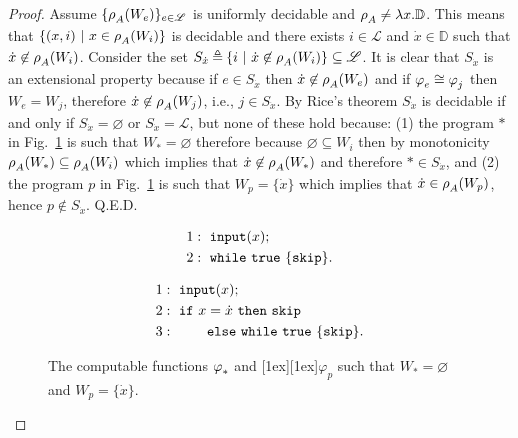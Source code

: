 \documentclass[runningheads]{llncs}
\def\ok#1{\mbox{\raisebox{0ex}[1ex][1ex]{$#1$}}}
\newcommand{\myqed}{\textsc{Q.E.D.}}
\newcommand{\ccL}{\mathscr{L}}
\newcommand{\Domain}{\mathbb{D}}
\newcommand{\pfunction}[3]{\ok{\varphi^{#2\, #3}_{#1}}}
\newcommand{\auco}[2]{\ok{\rho^{#1}_{#2}}}
\newcommand{\ud}{\ok{\:\triangleq\:}}
\def\ok#1{\mbox{\raisebox{0ex}[1ex][1ex]{$#1$}}}
\def\cAA{\ensuremath{A}}
\newcommand{\sset}[2]{\{#1  ~|~ #2\}}
\begin{document}
\begin{proof}
    Assume $\{\auco{}{\cAA}(W_e)\}_{e\in\ccL}$ is uniformly decidable and $\auco{}{\cAA}\neq\lambda x.\Domain$. This means that $\sset{(x,i)}{x\in\auco{}{\cAA}(W_i)}$ is decidable and there exists $i\in\ccL$ and $\dot{x}\in\Domain$ such that $\dot{x}\not\in \auco{}{\cAA}(W_i)$. Consider the set $S_{\dot{x}}\ud\sset{i}{\dot{x}\not\in \auco{}{\cAA}(W_i)}\subseteq\ccL$. It is clear that $S_{\dot{x}}$ is an extensional property because if $e\in S_{\dot{x}}$ then $\dot{x}\not\in \auco{}{\cAA}(W_e)$ and if $\pfunction{e}{}{}\cong\pfunction{j}{}{}$ then $W_e=W_j$, therefore $\dot{x}\not\in \auco{}{\cAA}(W_j)$, i.e., $j\in S_{\dot{x}}$. By Rice's theorem $S_{\dot{x}}$ is decidable if and only if $S_{\dot{x}}=\varnothing$ or $S_{\dot{x}}=\ccL$, but none of these hold because: (1) 
    the program $*$ in Fig.~\ref{simple-code} is such that $W_*=\varnothing$ therefore because $\varnothing\subseteq W_i$ then by monotonicity $\auco{}{\cAA}(W_*)\subseteq \auco{}{\cAA}(W_i)$ which implies that
    $\dot{x}\not\in \auco{}{\cAA}(W_*)$ and therefore $*\in S_{\dot{x}}$, and (2) the program $p$ in Fig.~\ref{simple-code} is such that $W_p=\{\dot{x}\}$ which implies that $\dot{x}\in \auco{}{\cAA}(W_p)$, hence $p\not\in S_{\dot{x}}$. \myqed
    \begin{figure}[t]
    \begin{minipage}{6cm}
    \begin{center}
    \begin{align*}
    &1:~{\tt input}(x);\\
    &2:~{\tt while}\ {\tt true}\ \{ {\tt skip}\}.\\
    \end{align*}
    \end{center}
    \end{minipage}
    \begin{minipage}{6cm}
    \begin{center}
    \begin{align*}
    &1:~{\tt input}(x);\\
    &2:~{\tt if}\ x =\dot{x}\ {\tt then}\ {\tt skip}\\
    &3:~\qquad{\tt else}\ {\tt while}\ {\tt true}\ \{ {\tt skip}\}.
    \end{align*}
    \end{center}
    \end{minipage}
        \caption{The computable functions $\pfunction{*}{}{}$ and \pfunction{p}{}{}
        such that $W_*=\varnothing$ and $W_p=\{\dot{x}\}.$}\label{simple-code}
    \end{figure}
\end{proof}
\end{document}
